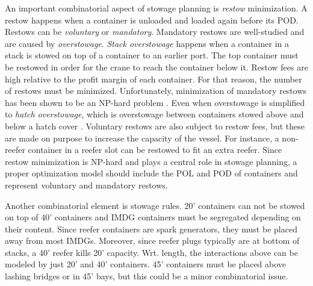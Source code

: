 \documentclass[preprint,12pt,authoryear]{elsarticle}
\begin{document}
An important combinatorial aspect of stowage planning is {\em restow} minimization. A restow happens when a container is unloaded and loaded again before its POD. Restows can be {\em voluntary} or {\em mandatory}. Mandatory restows are well-studied and are caused by {\em overstowage}. {\em Stack overstowage} happens when a container in a stack is stowed on top of a container to an earlier port. The top container must be restowed in order for the crane to reach the container below it.
Restow fees are high relative to the profit margin of each container. For that reason, the number of restows must be minimized. Unfortunately, minimization of mandatory restows has been shown to be an NP-hard problem \citep{Avriel2000ContainerGraphs}. Even when overstowage is simplified to {\em hatch overstowage}, which is overstowage between containers stowed above and below a hatch cover \citep{Tierney2014OnProblems}. Voluntary restows are also subject to restow fees, but these are made on purpose to increase the capacity of the vessel. For instance, a non-reefer container in a reefer slot can be restowed to fit an extra reefer. Since restow minimization is NP-hard and plays a central role in stowage planning, a proper optimization model should include the POL and POD of containers and represent voluntary and mandatory restows.


Another combinatorial element is stowage rules. 20' containers can not be stowed on top of 40' containers and IMDG containers must be segregated depending on their content. Since reefer containers are spark generators, they must be placed away from most IMDGs. Moreover, since reefer plugs typically are at bottom of stacks, a 40' reefer kills 20' capacity. Wrt. length, the interactions above can be modeled by just 20' and 40' containers. 45' containers must be placed above lashing bridges or in 45' bays, but this could be a minor combinatorial issue.
\end{document}
